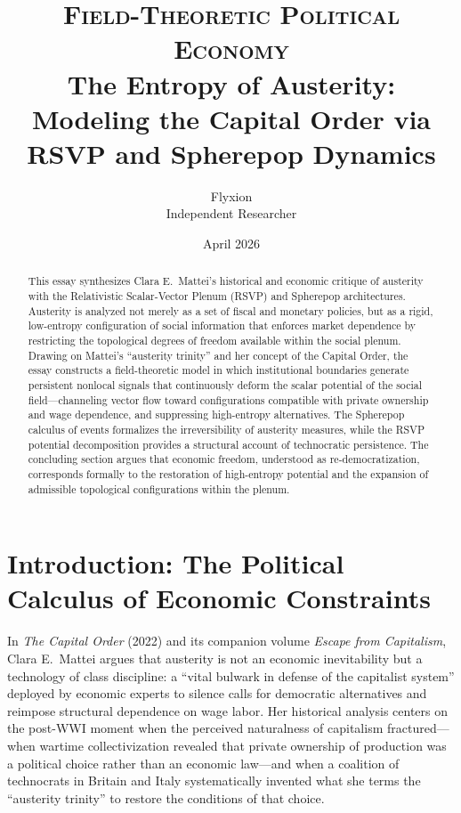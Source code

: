 \documentclass[12pt,a4paper]{article}
\title{%
  \vspace{-1cm}%
  {\large\scshape Field-Theoretic Political Economy}\\[6pt]
  {\LARGE\bfseries\color{deepblue}The Entropy of Austerity:\\[4pt]
  Modeling the Capital Order via\\[2pt]
  RSVP and Spherepop Dynamics}\\[10pt]
}
\author{Flyxion \\ \small Independent Researcher}
\date{\small April 2026}
\begin{document}
\maketitle
\thispagestyle{empty}

\begin{abstract}
\noindent
This essay synthesizes Clara E.\ Mattei's historical and economic critique of austerity with the Relativistic Scalar-Vector Plenum (RSVP) and Spherepop architectures. Austerity is analyzed not merely as a set of fiscal and monetary policies, but as a rigid, low-entropy configuration of social information that enforces market dependence by restricting the topological degrees of freedom available within the social plenum. Drawing on Mattei's ``austerity trinity'' and her concept of the Capital Order, the essay constructs a field-theoretic model in which institutional boundaries generate persistent nonlocal signals that continuously deform the scalar potential of the social field---channeling vector flow toward configurations compatible with private ownership and wage dependence, and suppressing high-entropy alternatives. The Spherepop calculus of events formalizes the irreversibility of austerity measures, while the RSVP potential decomposition provides a structural account of technocratic persistence. The concluding section argues that economic freedom, understood as re-democratization, corresponds formally to the restoration of high-entropy potential and the expansion of admissible topological configurations within the plenum.
\end{abstract}

\newpage

\section{Introduction: The Political Calculus of Economic Constraints}

In \emph{The Capital Order} (2022) and its companion volume \emph{Escape from Capitalism}, Clara E.\ Mattei argues that austerity is not an economic inevitability but a technology of class discipline: a ``vital bulwark in defense of the capitalist system'' deployed by economic experts to silence calls for democratic alternatives and reimpose structural dependence on wage labor. Her historical analysis centers on the post-WWI moment when the perceived naturalness of capitalism fractured---when wartime collectivization revealed that private ownership of production was a political choice rather than an economic law---and when a coalition of technocrats in Britain and Italy systematically invented what she terms the ``austerity trinity'' to restore the conditions of that choice.
\end{document}
